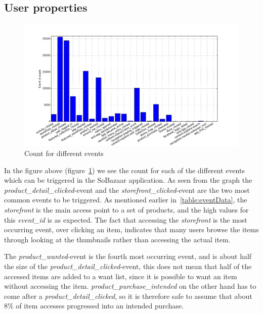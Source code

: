 \subsection{User properties}
    \begin{figure}[H]
        \includegraphics[width=5in]{image/event_iddistribution.png}
        \centering
        \caption{Count for different events}
    \label{figure:eventIDDistribution}
    \end{figure}
        In the figure above (figure~\ref{figure:eventIDDistribution}) we see the count for each of the different events which can be triggered in the SoBazaar application.
        As seen from the graph the \emph{product\_detail\_clicked}-event and the \emph{storefront\_clicked}-event are the two most common events to be triggered.
        As mentioned earlier in~\ref{table:eventData}, the \emph{storefront} is the main access point to a set of products, and the high values for this \emph{event\_id} is as expected.
        The fact that accessing the \emph{storefront} is the most occurring event, over clicking an item, indicates that many users browse the items through looking at the thumbnails rather than accessing the actual item.

        The \emph{product\_wanted}-event is the fourth most occurring event, and is about half the size of the \emph{product\_detail\_clicked}-event, this does not mean that half of the accessed items are added to a want list, since it is possible to want an item without accessing the item.
        \emph{product\_purchase\_intended} on the other hand has to come after a \emph{product\_detail\_clicked}, so it is therefore safe to assume that about 8\% of item accesses progressed into an intended purchase.

